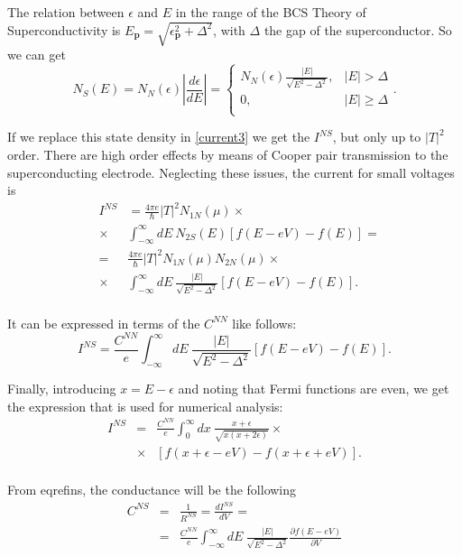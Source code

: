 \documentclass[twocolumn, twoside,a4paper,10pt]{article}
\begin{document}
The relation between $\epsilon$ and $E$ in the range of the BCS Theory of Superconductivity is $E_{\mathbf{p}} = \sqrt{\epsilon_{\mathbf{p}}^2 + \Delta^2}$, with $\Delta$ the gap of the superconductor. So we can get
\begin{equation}\label{ns}
N_S(E) = N_N(\epsilon) \left | \frac{d\epsilon}{dE} \right | =  
\left\{ 
\begin{array}{ll} 
N_N(\epsilon)\frac{|E|}{\sqrt{E^2-\Delta^2}},	&	|E| > \Delta 	\\ 
0,								& 	|E| \geq \Delta	\\
\end{array}
\right..
\end{equation}

If we replace this state density in \eqref{current3} we get the $I^{NS}$, but only up to $|T|^2$ order. There are high order effects by means of Cooper pair transmission to the superconducting electrode. Neglecting these issues, the current for small voltages is
\begin{eqnarray}\label{ins_previous}
&I^{NS}& = \frac{4\pi e}{\hbar} |T|^2 N_{1N}(\mu) \times
		\nonumber \\
		&\times& \int_{-\infty}^{\infty} dE\ N_{2S}(E) [f(E-eV)-f(E)] =
		\nonumber \\
		&=& \frac{4\pi e}{\hbar} |T|^2 N_{1N}(\mu) N_{2N}(\mu) \times
		\nonumber \\
		&\times& \int_{-\infty}^{\infty} dE\ \frac{|E|}{\sqrt{E^2-\Delta^2}} [f(E-eV)-f(E)].
		\nonumber \\
\end{eqnarray}

It can be expressed in terms of the $C^{NN}$ like follows:
\begin{equation}\label{ins}
I^{NS} = \frac{C^{NN}}{e} \int_{-\infty}^{\infty} dE\ \frac{|E|}{\sqrt{E^2-\Delta^2}} [f(E-eV)-f(E)].
\end{equation}

Finally, introducing $x=E-\epsilon$ and noting that Fermi functions are even, we get the expression that is used for numerical analysis:
\begin{eqnarray}\label{ins_numerical}
I^{NS} &=& \frac{C^{NN}}{e} \int_{0}^{\infty} dx\ \frac{x+\epsilon}{\sqrt{x(x+2\epsilon)}} \times
		\nonumber \\
		&\times& [f(x+\epsilon-eV)-f(x+\epsilon+eV)].
		\nonumber \\
\end{eqnarray}

From eqref{ins}, the conductance will be the following
\begin{eqnarray}\label{cns}
C^{NS} &=& \frac{1}{R^{NS}} = \frac{dI^{NS}}{dV} =
		\nonumber \\
		&=& \frac{C^{NN}}{e} \int_{-\infty}^{\infty} dE\ \frac{|E|}{\sqrt{E^2-\Delta^2}} 
		\frac{\partial f(E-eV)}{\partial V}
		\nonumber \\
\end{eqnarray}
\end{document}
